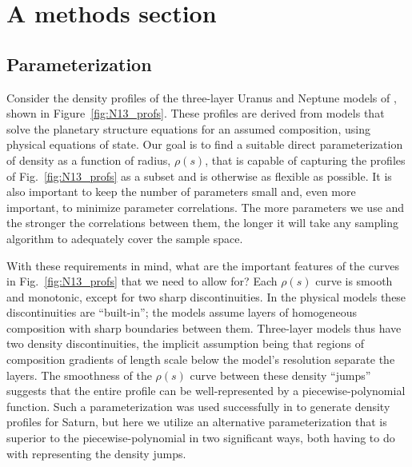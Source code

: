 
\section{A methods section}\label{sec:method}
\subsection{Parameterization}\label{sec:params}

Consider the density profiles of the three-layer Uranus and Neptune models of
\citet{Nettelmann2013b}, shown in Figure~\ref{fig:N13_profs}. These profiles are
derived from models that solve the planetary structure equations for an assumed
composition, using physical equations of state. Our goal is to find a suitable
direct parameterization of density as a function of radius, $\rho(s)$, that is
capable of capturing the profiles of Fig.~\ref{fig:N13_profs} as a subset and is
otherwise as flexible as possible. It is also important to keep the number of
parameters small and, even more important, to minimize parameter correlations.
The more parameters we use and the stronger the correlations between them, the
longer it will take any sampling algorithm to adequately cover the sample space.

With these requirements in mind, what are the important features of the curves
in Fig.~\ref{fig:N13_profs} that we need to allow for? Each $\rho(s)$ curve is
smooth and monotonic, except for two sharp discontinuities. In the physical
models these discontinuities are ``built-in''; the models assume layers of
homogeneous composition with sharp boundaries between them. Three-layer models
thus have two density discontinuities, the implicit assumption being that
regions of composition gradients of length scale below the model's resolution
separate the layers. The smoothness of the $\rho(s)$ curve between these density
``jumps'' suggests that the entire profile can be well-represented by a
piecewise-polynomial function. Such a parameterization was used successfully in
\citep{Movshovitz2020} to generate density profiles for Saturn, but here we
utilize an alternative parameterization that is superior to the
piecewise-polynomial in two significant ways, both having to do with
representing the density jumps.

